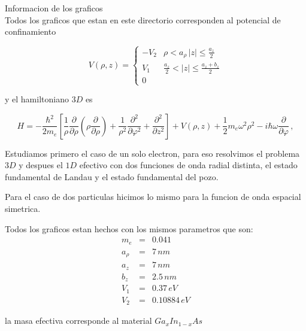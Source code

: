 \documentclass[10pt,a4paper]{article}
\begin{document}
\noindent
{\Large Informacion de los graficos}\\

Todos los graficos que estan en este directorio corresponden al potencial de confinamiento 

\begin{equation}
  V(\rho, z) = \left\{ \begin{matrix}
                         -V_2 & \rho<a_{\rho}\, |z|\leq\frac{a_z}{2} \\
                         V_1  & \frac{a_z}{2}< |z| \leq \frac{a_z + b_z}{2}\\
                         0    &
                       \end{matrix}\right.
\end{equation}

\noindent
y el hamiltoniano $3D$ es

\begin{equation}
H = -\frac{\hbar^2}{2 m_e}\left[\frac{1}{\rho}\frac{\partial}{\partial \rho}\left(\rho \frac{\partial}{\partial \rho} \right)
+ \frac{1}{\rho^2}\frac{\partial^2}{\partial \varphi^2}+\frac{\partial^2}{\partial z^2} \right] + V(\rho, z)
+ \frac{1}{2} m_e \omega^2 \rho^2 - i \hbar \omega \frac{\partial}{\partial \varphi}\, ,
\end{equation}

Estudiamos primero el caso de un solo electron, para eso resolvimos el problema $3D$ y despues el $1D$ efectivo con dos
funciones de onda radial distinta, el estado fundamental de Landau y el estado fundamental del pozo.

Para el caso de dos particulas hicimos lo mismo para la funcion de onda espacial simetrica.

Todos los graficos estan hechos con los mismos parametros que son:
\begin{eqnarray*}
m_e &=& 0.041\,  \\
a_{\rho} &=& 7\,nm\\
a_z &=& 7\,nm \\
b_z &=& 2.5\, nm \\
V_1 &=& 0.37\, eV \\
V_2 &=& 0.10884\, eV
\end{eqnarray*}

\noindent
la masa efectiva corresponde al material $Ga_xIn_{1-x}As$
\end{document}
